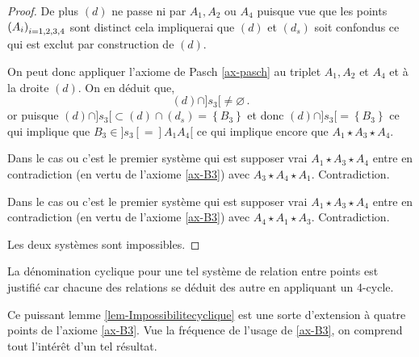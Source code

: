 \begin{lem}
\begin{proof}
        De plus $(d)$ ne passe ni par $A_1,A_2$ ou $A_4$ puisque vue que les points $\left(A_{i}\right)_{i = 1,2,3,4}$ sont distinct cela impliquerai que $(d)$ et $(d_s)$ soit confondus ce qui est exclut par construction de $(d)$.

        On peut donc appliquer l'axiome de Pasch \ref{ax-pasch} au triplet $A_1,A_2$ et $A_4$ et à la droite $(d)$. On en déduit que,
        \begin{equation*}
            (d)\cap]s_3[\neq \varnothing\,.
        \end{equation*}
        or puisque $(d)\cap]s_3[ \subset (d)\cap (d_s) = \left\{B_3 \right\}$ et donc $(d)\cap]s_3[ = \left\{B_3 \right\}$ ce qui implique que $B_3 \in ]s_3[ = ]A_1 A_4[$ ce qui implique encore que $A_1 \star A_3 \star A_4$. 
        
        Dans le cas ou c'est le premier système qui est supposer vrai $A_1 \star A_3 \star A_4$ entre en contradiction (en vertu de l'axiome \ref{ax-B3}) avec $A_{3} \star A_{4} \star A_{1}$. Contradiction.

        Dans le cas ou c'est le premier système qui est supposer vrai $A_1 \star A_3 \star A_4$ entre en contradiction (en vertu de l'axiome \ref{ax-B3}) avec $A_{4} \star A_{1} \star A_{3}$. Contradiction.

        Les deux systèmes sont impossibles.
    \end{proof}
\end{lem}
\begin{rema}
    La dénomination cyclique pour une tel système de relation entre points est justifié car chacune des relations se déduit des autre en appliquant un 4-cycle. 
\end{rema}
\begin{rema}
    Ce puissant lemme \ref{lem-Impossibilitecyclique} est une sorte d'extension à quatre points de l'axiome \ref{ax-B3}. Vue la fréquence de l'usage de \ref{ax-B3}, on comprend tout l'intérêt d'un tel résultat.
\end{rema}
